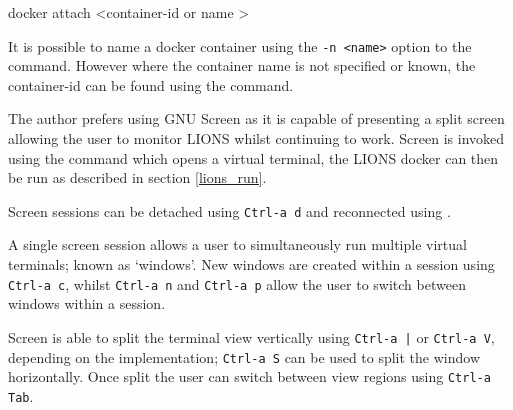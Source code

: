 \documentclass[11pt]{scrartcl}
\begin{document}
\begin{bash}
docker attach <container-id or name >
\end{bash}

It is possible to name a docker container using the \texttt{-n <name>} option to the  command. However where the container name is not specified or known,
the container-id can be found using the  command.

\vspace{2em}

The author prefers using GNU Screen as it is capable of presenting a split screen allowing the user to monitor LIONS whilst continuing to work. 
Screen is invoked using the command  which opens a virtual terminal, the LIONS docker can then be run as described in section \ref{lions_run}. 

Screen sessions can be detached using \texttt{Ctrl-a d} and reconnected using . 

A single screen session allows a user to simultaneously run multiple virtual terminals; known as `windows'. New windows are created within a session using \texttt{Ctrl-a c}, whilst \texttt{Ctrl-a n} and \texttt{Ctrl-a p} allow the user to switch between windows within a session.

Screen is able to split the terminal view vertically using \texttt{Ctrl-a |} or \texttt{Ctrl-a V}, depending on the implementation; \texttt{Ctrl-a S} can be used to split the window horizontally. Once split the user can switch between view regions using \texttt{Ctrl-a Tab}.

 
\end{document}
